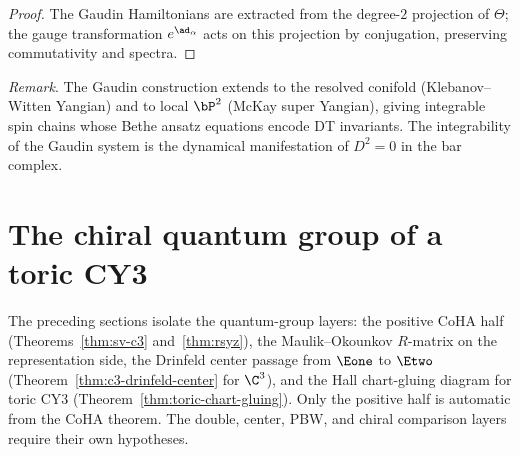 \begin{proof}
The Gaudin Hamiltonians are extracted from the degree-$2$ projection
of $\Theta$; the gauge transformation $e^{\ad_\alpha}$ acts on this
projection by conjugation, preserving commutativity and spectra.
\end{proof}

\noindent\textit{Remark}. The Gaudin construction extends to the
resolved conifold (Klebanov--Witten Yangian) and to local $\bP^2$
(McKay super Yangian), giving integrable spin chains whose Bethe
ansatz equations encode DT invariants. The integrability of the
Gaudin system is the dynamical manifestation of $D^2 = 0$ in the
bar complex.



\section{The chiral quantum group of a toric CY3}
\label{sec:toric-cy3-chiral-qg}

The preceding sections isolate the quantum-group layers: the positive
CoHA half (Theorems~\ref{thm:sv-c3} and~\ref{thm:rsyz}), the
Maulik--Okounkov $R$-matrix on the representation side, the Drinfeld
center passage from $\Eone$ to $\Etwo$
(Theorem~\ref{thm:c3-drinfeld-center} for $\C^3$), and the Hall
chart-gluing diagram for toric CY3
(Theorem~\ref{thm:toric-chart-gluing}). Only the positive half is
automatic from the CoHA theorem. The double, center, PBW, and chiral
comparison layers require their own hypotheses.

